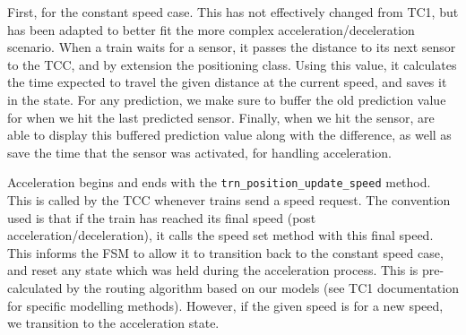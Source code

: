 \documentclass[12pt, titlepage]{article}
\begin{document}
    First, for the constant speed case. This has not effectively changed from TC1, but has been adapted to better fit the more complex acceleration/deceleration scenario. When a train waits for a sensor, it passes the distance to its next sensor to the TCC, and by extension the positioning class. Using this value, it calculates the time expected to travel the given distance at the current speed, and saves it in the state. For any prediction, we make sure to buffer the old prediction value for when we hit the last predicted sensor. Finally, when we hit the sensor, are able to display this buffered prediction value along with the difference, as well as save the time that the sensor was activated, for handling acceleration.
    
    Acceleration begins and ends with the \verb`trn_position_update_speed` method. This is called by the TCC whenever trains send a speed request. The convention used is that if the train has reached its final speed (post acceleration/deceleration), it calls the speed set method with this final speed. This informs the FSM to allow it to transition back to the constant speed case, and reset any state which was held during the acceleration process. This is pre-calculated by the routing algorithm based on our models (see TC1 documentation for specific modelling methods). However, if the given speed is for a new speed, we transition to the acceleration state.
    
\end{document}
